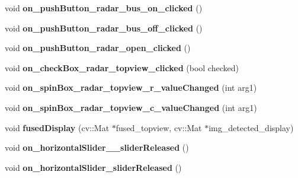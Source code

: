 \begin{DoxyCompactItemize}
\item 
\hypertarget{class_main_window_a76a71322a2f8bc6f01f7a707cc73093e}{}void {\bfseries on\+\_\+push\+Button\+\_\+radar\+\_\+bus\+\_\+on\+\_\+clicked} ()\label{class_main_window_a76a71322a2f8bc6f01f7a707cc73093e}

\item 
\hypertarget{class_main_window_a3a75e1394b03fc2fa74f4f2fbe2f88d9}{}void {\bfseries on\+\_\+push\+Button\+\_\+radar\+\_\+bus\+\_\+off\+\_\+clicked} ()\label{class_main_window_a3a75e1394b03fc2fa74f4f2fbe2f88d9}

\item 
\hypertarget{class_main_window_a5b0bba61eff7a7257c03c85a42afb70f}{}void {\bfseries on\+\_\+push\+Button\+\_\+radar\+\_\+open\+\_\+clicked} ()\label{class_main_window_a5b0bba61eff7a7257c03c85a42afb70f}

\item 
\hypertarget{class_main_window_a13a9eb8072e61993c1ee52d1dcf6843c}{}void {\bfseries on\+\_\+check\+Box\+\_\+radar\+\_\+topview\+\_\+clicked} (bool checked)\label{class_main_window_a13a9eb8072e61993c1ee52d1dcf6843c}

\item 
\hypertarget{class_main_window_ade269ccff5b9b26d487423d31ec19adf}{}void {\bfseries on\+\_\+spin\+Box\+\_\+radar\+\_\+topview\+\_\+r\+\_\+value\+Changed} (int arg1)\label{class_main_window_ade269ccff5b9b26d487423d31ec19adf}

\item 
\hypertarget{class_main_window_a8f2714912f4335593fcc6a4cd1999dd9}{}void {\bfseries on\+\_\+spin\+Box\+\_\+radar\+\_\+topview\+\_\+c\+\_\+value\+Changed} (int arg1)\label{class_main_window_a8f2714912f4335593fcc6a4cd1999dd9}

\item 
\hypertarget{class_main_window_a5ae4659c9b00e173fe6214e10c76e925}{}void {\bfseries fused\+Display} (cv\+::\+Mat $\ast$fused\+\_\+topview, cv\+::\+Mat $\ast$img\+\_\+detected\+\_\+display)\label{class_main_window_a5ae4659c9b00e173fe6214e10c76e925}

\item 
\hypertarget{class_main_window_a5363260e5ea8d86839f8ce9bd8f82cf1}{}void {\bfseries on\+\_\+horizontal\+Slider\+\_\+\_\+slider\+Released} ()\label{class_main_window_a5363260e5ea8d86839f8ce9bd8f82cf1}

\item 
\hypertarget{class_main_window_aee38d2cc3c3f234bb29c7b586eaaab71}{}void {\bfseries on\+\_\+horizontal\+Slider\+\_\+slider\+Released} ()\label{class_main_window_aee38d2cc3c3f234bb29c7b586eaaab71}


\end{DoxyCompactItemize}
